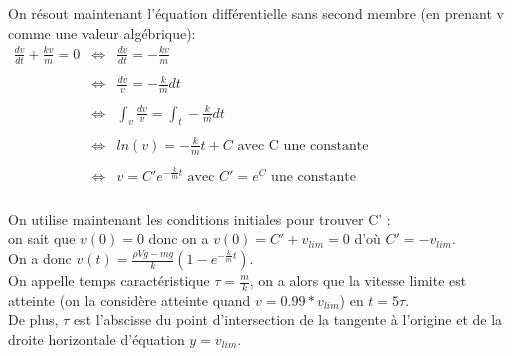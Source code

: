 \documentclass[a4paper,10pt]{book}
\begin{document}
On résout maintenant l'équation différentielle sans second membre (en prenant v comme une valeur algébrique):\\

$\begin{array}{rcl}\frac{dv}{dt}+\frac{kv}{m}=0 &\Leftrightarrow& \frac{dv}{dt}=-\frac{kv}{m} \\\\
&\Leftrightarrow& \frac{dv}{v}=-\frac{k}{m}dt \\\\
&\Leftrightarrow& \displaystyle \int_{v} \frac{dv}{v}=\displaystyle \int_{t} -\frac{k}{m}dt \\\\
&\Leftrightarrow& ln(v)=-\frac{k}{m}t+C \text{ avec C une constante}\\\\
&\Leftrightarrow& v=C' e^{-\frac{k}{m}t} \text{ avec } C'=e^{C} \text{ une constante} \\\\ \end{array} $

On utilise maintenant les conditions initiales pour trouver C' :\\
on sait que $v(0)=0$ donc on a $v(0)=C'+v_{lim}=0$ d'où $C'=-v_{lim}$.\\

On a donc $v(t)=\frac{\rho Vg-mg}{k}(1-e^{-\frac{k}{m}t})$.\\

On appelle temps caractéristique $\tau =\frac{m}{k}$, on a alors que la vitesse limite est atteinte (on la considère atteinte quand $v=0.99*v_{lim}$) en $t=5\tau$.\\
De plus, $\tau$ est l'abscisse du point d'intersection de la tangente à l'origine et de la droite horizontale d'équation $y=v_{lim}$.
\end{document}
